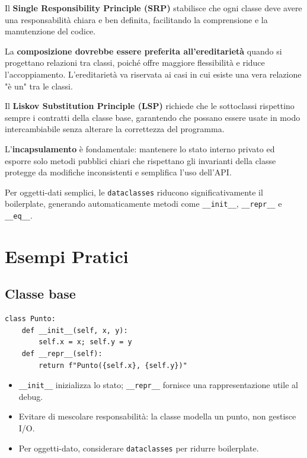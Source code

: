 \begin{tcolorbox}[title=Principi di design OOP]
Il \textbf{Single Responsibility Principle (SRP)} stabilisce che ogni classe deve avere una responsabilità chiara e ben definita, facilitando la comprensione e la manutenzione del codice.

La \textbf{composizione dovrebbe essere preferita all'ereditarietà} quando si progettano relazioni tra classi, poiché offre maggiore flessibilità e riduce l'accoppiamento. L'ereditarietà va riservata ai casi in cui esiste una vera relazione "è un" tra le classi.

Il \textbf{Liskov Substitution Principle (LSP)} richiede che le sottoclassi rispettino sempre i contratti della classe base, garantendo che possano essere usate in modo intercambiabile senza alterare la correttezza del programma.

L'\textbf{incapsulamento} è fondamentale: mantenere lo stato interno privato ed esporre solo metodi pubblici chiari che rispettano gli invarianti della classe protegge da modifiche inconsistenti e semplifica l'uso dell'API.

Per oggetti-dati semplici, le \texttt{dataclasses} riducono significativamente il boilerplate, generando automaticamente metodi come \verb|__init__|, \verb|__repr__| e \verb|__eq__|.
\end{tcolorbox}

\section{Esempi Pratici}
\subsection{Classe base}
\begin{lstlisting}
class Punto:
    def __init__(self, x, y):
        self.x = x; self.y = y
    def __repr__(self):
        return f"Punto({self.x}, {self.y})"
\end{lstlisting}

\begin{tcolorbox}[title=Spiegazione]
\begin{itemize}
  \item \texttt{\_\_init\_\_} inizializza lo stato; \texttt{\_\_repr\_\_} fornisce una rappresentazione utile al debug.
  \item Evitare di mescolare responsabilità: la classe modella un punto, non gestisce I/O.
  \item Per oggetti-dato, considerare \texttt{dataclasses} per ridurre boilerplate.
\end{itemize}
\end{tcolorbox}

